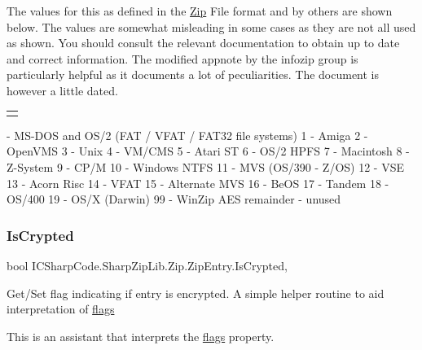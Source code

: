 The values for this as defined in the \hyperlink{namespace_i_c_sharp_code_1_1_sharp_zip_lib_1_1_zip}{Zip} File format and by others are shown below. The values are somewhat misleading in some cases as they are not all used as shown. You should consult the relevant documentation to obtain up to date and correct information. The modified appnote by the infozip group is particularly helpful as it documents a lot of peculiarities. The document is however a little dated. \tabulinesep=1mm
\begin{longtabu} spread 0pt [c]{*{0}{|X[-1]}|}
\hline
\\
\end{longtabu}
-\/ M\+S-\/\+D\+OS and O\+S/2 (F\+AT / V\+F\+AT / F\+A\+T32 file systems) 1 -\/ Amiga 2 -\/ Open\+V\+MS 3 -\/ Unix 4 -\/ V\+M/\+C\+MS 5 -\/ Atari ST 6 -\/ O\+S/2 H\+P\+FS 7 -\/ Macintosh 8 -\/ Z-\/\+System 9 -\/ C\+P/M 10 -\/ Windows N\+T\+FS 11 -\/ M\+VS (O\+S/390 -\/ Z/\+OS) 12 -\/ V\+SE 13 -\/ Acorn Risc 14 -\/ V\+F\+AT 15 -\/ Alternate M\+VS 16 -\/ Be\+OS 17 -\/ Tandem 18 -\/ O\+S/400 19 -\/ O\+S/X (Darwin) 99 -\/ Win\+Zip A\+ES remainder -\/ unused \mbox{\label{class_i_c_sharp_code_1_1_sharp_zip_lib_1_1_zip_1_1_zip_entry_a3bb47622c085083f65c8d158633e2913}} 
\subsubsection{\texorpdfstring{Is\+Crypted}{IsCrypted}}
{\footnotesize\ttfamily bool I\+C\+Sharp\+Code.\+Sharp\+Zip\+Lib.\+Zip.\+Zip\+Entry.\+Is\+Crypted\hspace{0.3cm}{\ttfamily [get]}, {\ttfamily [set]}}



Get/\+Set flag indicating if entry is encrypted. A simple helper routine to aid interpretation of \hyperlink{class_i_c_sharp_code_1_1_sharp_zip_lib_1_1_zip_1_1_zip_entry_a144e1d24c10438c31ccffab26073d40b}{flags} 

This is an assistant that interprets the \hyperlink{class_i_c_sharp_code_1_1_sharp_zip_lib_1_1_zip_1_1_zip_entry_a144e1d24c10438c31ccffab26073d40b}{flags} property.\mbox{\label{class_i_c_sharp_code_1_1_sharp_zip_lib_1_1_zip_1_1_zip_entry_a7246dfbab647be04db33f1482e504636}} 
